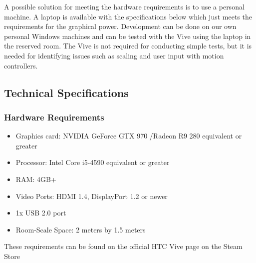 A possible solution for meeting the hardware requirements is to use a personal machine. A laptop is available with the specifications below which just meets the requirements for the graphical power. Development can be done on our own personal Windows machines and can be tested with the Vive using the laptop in the reserved room. The Vive is not required for conducting simple tests, but it is needed for identifying issues such as scaling and user input with motion controllers.

\subsection{Technical Specifications}

\subsubsection{Hardware Requirements}
\begin{itemize}
	\item Graphics card: NVIDIA GeForce GTX 970 /Radeon R9 280 equivalent or greater
	\item Processor: Intel Core i5-4590 equivalent or greater
	\item RAM: 4GB+
	\item Video Ports: HDMI 1.4, DisplayPort 1.2 or newer 
	\item 1x USB 2.0 port
	\item Room-Scale Space: 2 meters by 1.5 meters
\end{itemize}

These requirements can be found on the official HTC Vive page on the Steam Store \cite{vivehardware}